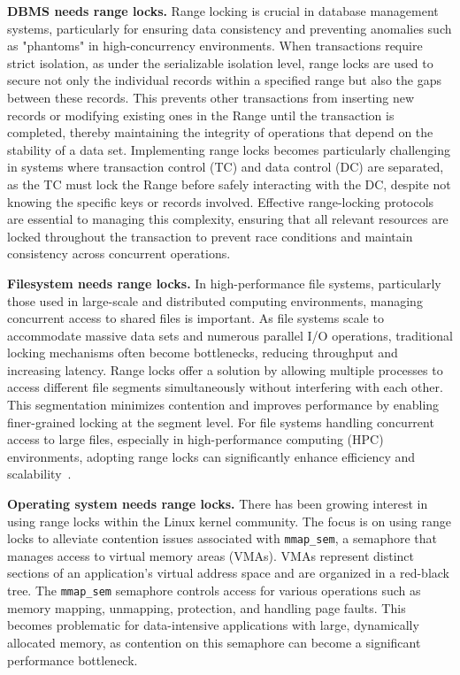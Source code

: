 \textbf{DBMS needs range locks.}
Range locking is crucial in database management systems, particularly for ensuring data consistency and preventing anomalies such as "phantoms" in high-concurrency environments. 
When transactions require strict isolation, as under the serializable isolation level, range locks are used to secure not only the individual records within a specified range but also the gaps between these records. 
This prevents other transactions from inserting new records or modifying existing ones in the Range until the transaction is completed, thereby maintaining the integrity of operations that depend on the stability of a data set. 
Implementing range locks becomes particularly challenging in systems where transaction control (TC) and data control (DC) are separated, as the TC must lock the Range before safely interacting with the DC, despite not knowing the specific keys or records involved. 
Effective range-locking protocols are essential to managing this complexity, ensuring that all relevant resources are locked throughout the transaction to prevent race conditions and maintain consistency across concurrent operations.

\textbf{Filesystem needs range locks.}
In high-performance file systems, particularly those used in large-scale and distributed computing environments, managing concurrent access to shared files is important. As file systems scale to accommodate massive data sets and numerous parallel I/O operations, traditional locking mechanisms often become bottlenecks, reducing throughput and increasing latency. Range locks offer a solution by allowing multiple processes to access different file segments simultaneously without interfering with each other. This segmentation minimizes contention and improves performance by enabling finer-grained locking at the segment level. For file systems handling concurrent access to large files, especially in high-performance computing (HPC) environments, adopting range locks can significantly enhance efficiency and scalability~\parencite{gao2023citron, lee2021concurrent}.

\textbf{Operating system needs range locks.}
There has been growing interest in using range locks within the Linux kernel community. The focus is on using range locks to alleviate contention issues associated with \texttt{mmap\_sem}, a semaphore that manages access to virtual memory areas (VMAs). VMAs represent distinct sections of an application's virtual address space and are organized in a red-black tree. The \texttt{mmap\_sem} semaphore controls access for various operations such as memory mapping, unmapping, protection, and handling page faults. This becomes problematic for data-intensive applications with large, dynamically allocated memory, as contention on this semaphore can become a significant performance bottleneck.

